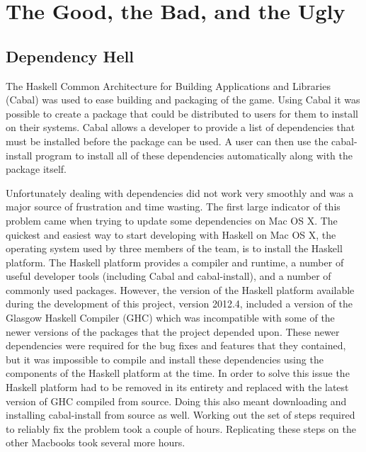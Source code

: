 \section{The Good, the Bad, and the Ugly}


\subsection{Dependency Hell}

The Haskell Common Architecture for Building Applications and Libraries (Cabal) was used to ease
building and packaging of the game. Using Cabal it was possible to create a package that could be
distributed to users for them to install on their systems. Cabal allows a developer to provide a
list of dependencies that must be installed before the package can be used. A user can then use
the cabal-install program to install all of these dependencies automatically along with the package
itself.

Unfortunately dealing with dependencies did not work very smoothly and was a major source of
frustration and time wasting. The first large indicator of this problem came when trying to
update some dependencies on Mac OS X. The quickest and easiest way to start developing with Haskell on
Mac OS X, the operating system used by three members of the team, is to install the Haskell platform.
The Haskell platform provides a compiler and runtime, a number of useful developer tools (including
Cabal and cabal-install), and a number of commonly used packages. However, the version of the
Haskell platform available during the development of this project, version 2012.4, included a
version of the Glasgow Haskell Compiler (GHC) which was incompatible with some of the newer
versions of the packages that the project depended upon. These newer dependencies were required
for the bug fixes and features that they contained, but it was impossible to compile and install
these dependencies using the components of the Haskell platform at the time. In order to solve
this issue the Haskell platform had to be removed in its entirety and replaced with the latest
version of GHC compiled from source. Doing this also meant downloading and installing cabal-install
from source as well. Working out the set of steps required to reliably fix the problem took
a couple of hours. Replicating these steps on the other Macbooks took several more hours.

